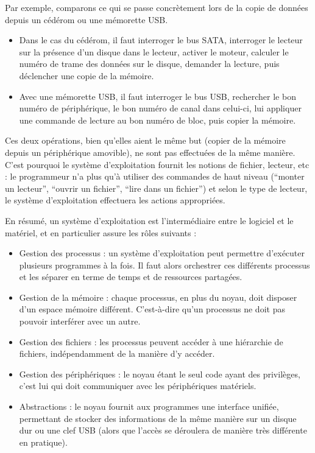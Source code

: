 Par exemple, comparons ce qui se passe concrètement lors de la copie de données
depuis un cédérom ou une mémorette USB.

\begin{itemize}

  \item Dans le cas du cédérom, il faut interroger le bus SATA, interroger le
    lecteur sur la présence d'un disque dans le lecteur, activer le moteur,
    calculer le numéro de trame des données sur le disque, demander la lecture,
    puis déclencher une
    copie de la mémoire.

  \item Avec une mémorette USB, il faut interroger le bus USB, rechercher le bon
    numéro de périphérique, le bon numéro de canal dans celui-ci, lui appliquer
    une commande de lecture au bon numéro de bloc, puis copier la mémoire.

\end{itemize}

Ces deux opérations, bien qu'elles aient le même but (copier de la mémoire
depuis un périphérique amovible), ne sont pas effectuées de la même manière.
C'est pourquoi le système d'exploitation fournit les notions de fichier,
lecteur, etc : le programmeur n'a plus qu'à utiliser des commandes de haut
niveau (``monter un lecteur'', ``ouvrir un fichier'', ``lire dans un fichier'')
et selon le type de lecteur, le système d'exploitation effectuera les actions
appropriées.

En résumé, un système d'exploitation est l'intermédiaire entre le logiciel et
le matériel, et en particulier assure les rôles suivants :


\begin{itemize}
\item
  Gestion des processus : un système d'exploitation peut permettre
  d'exécuter plusieurs programmes à la fois. Il faut alors orchestrer
  ces différents processus et les séparer en terme de temps et de
  ressources partagées.
\item
  Gestion de la mémoire : chaque processus, en plus du noyau, doit
  disposer d'un espace mémoire différent. C'est-à-dire qu'un processus
  ne doit pas pouvoir interférer avec un autre.
\item
  Gestion des fichiers : les processus peuvent accéder à une hiérarchie de
  fichiers, indépendamment de la manière d'y accéder.
\item
  Gestion des périphériques : le noyau étant le seul code ayant des privilèges,
  c'est lui qui doit communiquer avec les périphériques matériels.
\item
  Abstractions : le noyau fournit aux programmes une interface unifiée,
  permettant de stocker des informations de la même manière sur un
  disque dur ou une clef USB (alors que l'accès se déroulera de manière
  très différente en pratique).
\end{itemize}


